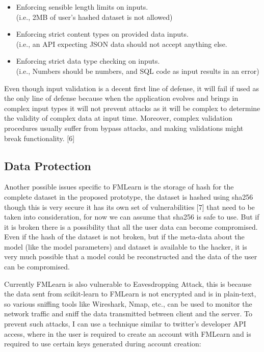 \begin{itemize}
    \item Enforcing sensible length limits on inputs.\\
    (i.e., 2MB of user’s hashed dataset is not allowed)
    \item Enforcing strict content types on provided data inputs.\\
    (i.e., an API expecting JSON data should not accept anything else.
    \item Enforcing strict data type checking on inputs.\\
    (i.e., Numbers should be numbers, and SQL code as input results in an error)
\end{itemize}

Even though input validation is a decent first line of defense, it will fail if used as the only line of defense because when the application evolves and brings in complex input types it will not prevent attacks as it will be complex to determine the validity of complex data at input time. Moreover, complex validation procedures usually suffer from bypass attacks, and making validations might break functionality. [6]

\subsection{Data Protection}
Another possible issues specific to FMLearn is the storage of hash for the complete dataset in the proposed prototype, the dataset is hashed using sha256 though this is very secure it has its own set of vulnerabilities [7] that need to be taken into consideration, for now we can assume that sha256 is safe to use. But if it is broken there is a possibility that all the user data can become compromised. Even if the hash of the dataset is not broken, but if the meta-data about the model (like the model parameters) and dataset is available to the hacker, it is very much possible that a model could be reconstructed and the data of the user can be compromised.

Currently FMLearn is also vulnerable to Eavesdropping Attack, this is because the data sent from scikit-learn to FMLearn is not encrypted and is in plain-text, so various sniffing tools like Wireshark, Nmap, etc., can be used to monitor the network traffic and sniff the data transmitted between client and the server. To prevent such attacks, I can use a technique similar to twitter’s developer API access, where in the user is required to create an account with FMLearn and is required to use certain keys generated during account creation:

